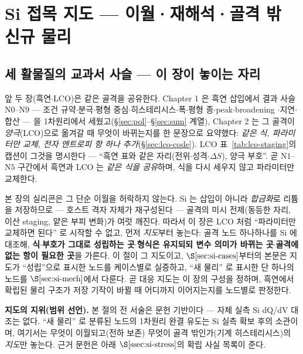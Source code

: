 \section{Si 접목 지도 --- 이월·재해석·골격 밖 신규 물리}\label{sec:si-map}

\subsection{세 활물질의 교과서 사슬 --- 이 장이 놓이는 자리}\label{ssec:si-arc}
앞 두 장(흑연$\cdot$LCO)은 같은 골격을 공유한다. Chapter 1 은 흑연 삽입에서 결과 사슬 $\mathrm{N0}$--$\mathrm{N9}$
--- 조건 규약$\cdot$분극$\cdot$평형 중심$\cdot$히스테리시스$\cdot$폭$\cdot$평형 종$\cdot$peak$\cdot$broadening
$\cdot$지연$\cdot$합산 --- 을 1차원리에서 세웠고(\S\ref{sec:pol}--\S\ref{sec:sum} 계열), Chapter 2 는 그
골격이 \emph{양극}(LCO)으로 옮겨갈 때 무엇이 바뀌는지를 한 문장으로 요약했다: \emph{같은 식, 파라미터만
교체, 전자 엔트로피 항 하나 추가}(\S\ref{sec:lco-code}). LCO 표~\ref{tab:lco-staging}의 캡션이
그것을 명시한다 --- ``흑연 표와 같은 자리(전위$\cdot$성격$\cdot\Delta S$), 양극 부호''. 곧 $\mathrm{N1}$--$\mathrm{N5}$
구간에서 흑연과 LCO 는 \emph{같은 식을 공유}하며, 식을 다시 세우지 않고 파라미터만 교체한다.

본 장의 실리콘은 그 단순 이월을 허락하지 않는다. Si 는 삽입이 아니라 \emph{합금화}로 리튬을 저장하므로
--- 호스트 격자 자체가 재구성된다 --- 골격의 미시 전제(동등한 자리, 이산 staging, 얕은 부피 변화)가
여럿 깨진다. 따라서 이 장은 LCO 처럼 ``파라미터만 교체하면 된다'' 로 시작할 수 없고, 먼저 \emph{지도}부터
놓는다: 골격 노드 하나하나를 Si 에 대조해, \textbf{식$\cdot$부호가 그대로 성립하는 곳}$\cdot$\textbf{형식은
유지되되 변수 의미가 바뀌는 곳}$\cdot$\textbf{골격에 없는 항이 필요한 곳}을 가른다. 이 절이 그 지도이고,
$\S\ref{sec:si-cases}$부터의 본문은 지도가 ``성립''으로 표시한 노드를 케이스별로 실증하고, ``새 물리'' 로
표시한 단 하나의 노드를 $\S\ref{sec:si-mech}$에서 다룬다. 곧 대응 지도는 이 장의 구성을 정하며, 흑연에서
확립된 물리 구조가 저장 기작이 바뀔 때 어디까지 이어지는지를 노드별로 판정한다.

\begin{bgbox}
\textbf{지도의 지위(범위 선언).} 본 절의 전 서술은 문헌 기반이다 --- 자체 실측 Si dQ/dV 대조는 없다.
``새 물리'' 로 분류된 노드의 1차원리 완결 유도는 Si 실측 확보 후의 소관이며, 여기서는 무엇이
이월되고(전하 보존) 무엇이 골격 밖인가(기계 히스테리시스)의 \emph{지도}만 놓는다. 근거 문헌은 아래
$\S\ref{ssec:si-stress}$의 확립 사실 목록이 준다.
\end{bgbox}

